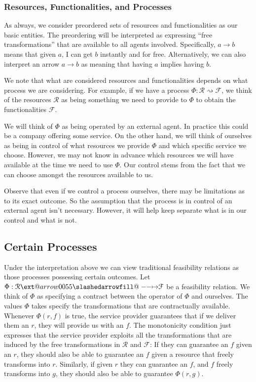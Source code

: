 \documentclass[12pt]{article}
\makeatletter
\theoremstyle{definition}
\theoremstyle{plain}
\theoremstyle{plain}
\theoremstyle{plain}
\theoremstyle{plain}
\theoremstyle{remark}
\theoremstyle{remark}
\newcommand{\mc}[1]{\mathcal{#1}}
\def\slashedarrowfill@#1#2#3#4#5{%
	$\m@th\thickmuskip0mu\medmuskip\thickmuskip\thinmuskip\thickmuskip
	\relax#5#1\mkern-7mu%
	\cleaders\hbox{$#5\mkern-2mu#2\mkern-2mu$}\hfill
	\mathclap{#3}\mathclap{#2}%
	\cleaders\hbox{$#5\mkern-2mu#2\mkern-2mu$}\hfill
	\mkern-7mu#4$%
}
\def\rightslashedarrowfill@{%
	\slashedarrowfill@\relbar\relbar\mapstochar\rightarrow}
\newcommand\xslashedrightarrow[2][]{%
	\ext@arrow 0055{\rightslashedarrowfill@}{#1}{#2}}
\makeatother
\begin{document}
\subsubsection{Resources, Functionalities, and Processes}
As always, we consider preordered sets of resources and functionalities as our basic entities. The preordering will be interpreted as expressing ``free transformations'' that are available to all agents involved. Specifically, $a \rightarrow b$ means that given $a$, I can get $b$ instantly and for free. Alternatively, we can also interpret an arrow $a \rightarrow b$ as meaning that having $a$ implies having $b$. 

We note that what are considered resources and functionalities depends on what process we are considering. For example, if we have a process $\Phi: \mc{R} \rightsquigarrow \mc{F}$, we think of the resources $\mc{R}$ as being something we need to provide to $\Phi$ to obtain the functionalities $\mc{F}$.

We will think of $\Phi$ as being operated by an external agent. In practice this could be a company offering some service. On the other hand, we will think of ourselves as being in control of what resources we provide $\Phi$ and which specific service we choose. However, we may not know in advance which resources we will have available at the time we need to use $\Phi$. Our control stems from the fact that we can choose amongst the resources available to us.

Observe that even if we control a process ourselves, there may be limitations as to its exact outcome. So the assumption that the process is in control of an external agent isn't necessary. However, it will help keep separate what is in our control and what is not.

\subsection{Certain Processes}
Under the interpretation above we can view traditional feasibility relations as those processes possessing certain outcomes. Let $\Phi: \mc{R} \xslashedrightarrow{} \mc{F}$ be a feasibility relation. We think of $\Phi$ as specifying a contract between the operator of $\Phi$ and ourselves. The values $\Phi$ takes specify the transformations that are contractually available. Whenever $\Phi(r,f)$ is true, the service provider guarantees that if we deliver them an $r$, they will provide us with an $f$. The monotonicity condition just expresses that the service provider exploits all the transformations that are induced by the free transformations in $\mc{R}$ and $\mc{F}$: If they can guarantee an $f$ given an $r$, they should also be able to guarantee an $f$ given a resource that freely transforms into $r$. Similarly, if given $r$ they can guarantee an $f$, and $f$ freely transforms into $g$, they should also be able to guarantee $\Phi(r,g)$.
\end{document}

